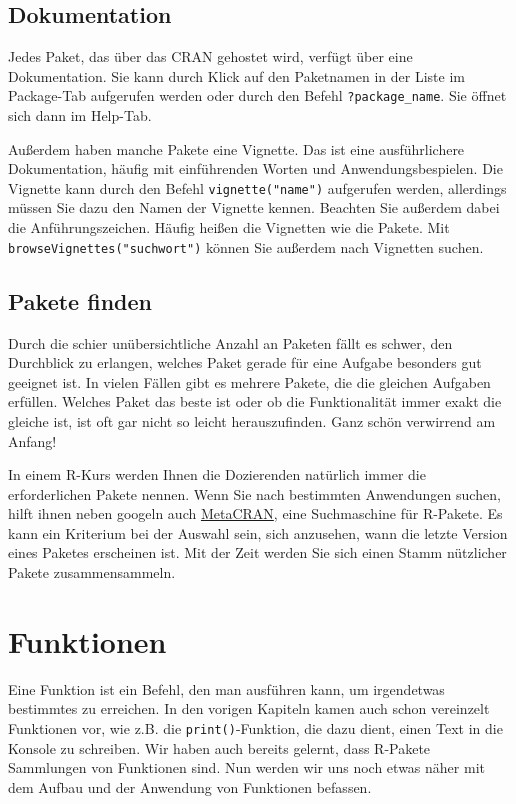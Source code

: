 \documentclass[
]{book}
\begin{document}
\hypertarget{dokumentation}{%
\subsection{Dokumentation}\label{dokumentation}}

Jedes Paket, das über das CRAN gehostet wird, verfügt über eine Dokumentation. Sie kann durch Klick auf den Paketnamen in der Liste im Package-Tab aufgerufen werden oder durch den Befehl \texttt{?package\_name}. Sie öffnet sich dann im Help-Tab.

Außerdem haben manche Pakete eine Vignette. Das ist eine ausführlichere Dokumentation, häufig mit einführenden Worten und Anwendungsbespielen. Die Vignette kann durch den Befehl \texttt{vignette("name")} aufgerufen werden, allerdings müssen Sie dazu den Namen der Vignette kennen. Beachten Sie außerdem dabei die Anführungszeichen. Häufig heißen die Vignetten wie die Pakete. Mit \texttt{browseVignettes("suchwort")} können Sie außerdem nach Vignetten suchen.

\hypertarget{pakete-finden}{%
\subsection{Pakete finden}\label{pakete-finden}}

Durch die schier unübersichtliche Anzahl an Paketen fällt es schwer, den Durchblick zu erlangen, welches Paket gerade für eine Aufgabe besonders gut geeignet ist. In vielen Fällen gibt es mehrere Pakete, die die gleichen Aufgaben erfüllen. Welches Paket das beste ist oder ob die Funktionalität immer exakt die gleiche ist, ist oft gar nicht so leicht herauszufinden. Ganz schön verwirrend am Anfang!

In einem R-Kurs werden Ihnen die Dozierenden natürlich immer die erforderlichen Pakete nennen. Wenn Sie nach bestimmten Anwendungen suchen, hilft ihnen neben googeln auch \href{https://www.r-pkg.org/}{MetaCRAN}, eine Suchmaschine für R-Pakete. Es kann ein Kriterium bei der Auswahl sein, sich anzusehen, wann die letzte Version eines Paketes erscheinen ist. Mit der Zeit werden Sie sich einen Stamm nützlicher Pakete zusammensammeln.

\hypertarget{funktionen}{%
\section{Funktionen}\label{funktionen}}

Eine Funktion ist ein Befehl, den man ausführen kann, um irgendetwas bestimmtes zu erreichen. In den vorigen Kapiteln kamen auch schon vereinzelt Funktionen vor, wie z.B. die \texttt{print()}-Funktion, die dazu dient, einen Text in die Konsole zu schreiben. Wir haben auch bereits gelernt, dass R-Pakete Sammlungen von Funktionen sind. Nun werden wir uns noch etwas näher mit dem Aufbau und der Anwendung von Funktionen befassen.
\end{document}
